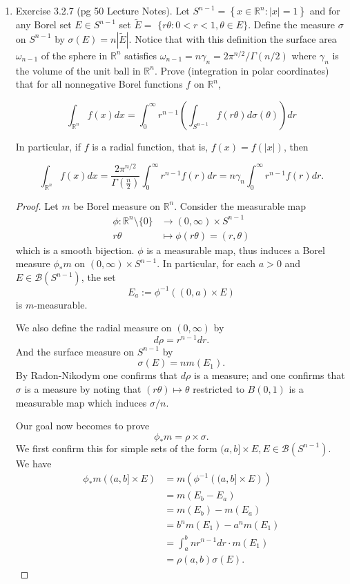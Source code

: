 
\begin{enumerate}
	\item Exercise 3.2.7 (pg 50 Lecture Notes). 
Let $S^{n-1}=\left\{x \in \mathbb{R}^n:|x|=1\right\}$ and for any Borel set $E \in S^{n-1}$ set $\widetilde{E}=$ $\{r \theta: 0<r<1, \theta \in E\}$. Define the measure $\sigma$ on $S^{n-1}$ by $\sigma(E)=n|\widetilde{E}|$. Notice that with this definition the surface area $\omega_{n-1}$ of the sphere in $\mathbb{R}^n$ satisfies $\omega_{n-1}=n \gamma_n=2 \pi^{n / 2} / \Gamma(n / 2)$ where $\gamma_n$ is the volume of the unit ball in $\mathbb{R}^n$. Prove (integration in polar coordinates) that for all nonnegative Borel functions $f$ on $\mathbb{R}^n$,

\[
\int_{\mathbb{R}^n} f(x) d x=\int_0^{\infty} r^{n-1}\left(\int_{S^{n-1}} f(r \theta) d \sigma(\theta)\right) d r
\]


In particular, if $f$ is a radial function, that is, $f(x)=f(|x|)$, then

\[
\int_{\mathbb{R}^n} f(x) d x=\frac{2 \pi^{n / 2}}{\Gamma\left(\frac{n}{2}\right)} \int_0^{\infty} r^{n-1} f(r) d r=n \gamma_n \int_0^{\infty} r^{n-1} f(r) d r
.\]
\begin{proof}
	Let $m$ be Borel measure on $\mathbb{R}^n$.
	Consider the measurable map
	\begin{align*}
		\phi: \mathbb{R}^n \setminus \{0\}  &\longrightarrow (0,\infty ) \times S^{n - 1} \\
		r \theta &\longmapsto \phi(r \theta) = (r, \theta)
	\end{align*}
	which is a smooth bijection. $\phi$ is a measurable map, thus induces a Borel measure $\phi_*m$ on $(0,\infty ) \times S^{n - 1}$. In particular, for each $a > 0$ and $E \in \mathcal{B}(S^{n - 1})$, the set
	\[
		E_a := \phi^{ - 1} \left( (0,a) \times E \right) 
	\] 
	is $m$-measurable.

	We also define the radial measure on $(0,\infty )$ by
	\[
		d \rho = r^{n - 1} dr
	.\] 
	And the surface measure on $S^{n - 1}$ by
	\[
		\sigma(E) = n m(E_1)
	.\] 
	By Radon-Nikodym one confirms that $d \rho$ is a measure; and one confirms that $\sigma$ is a measure by noting that $(r \theta) \mapsto \theta$ restricted to $B(0,1)$ is a measurable map which induces $\sigma / n$.

	Our goal now becomes to prove
	\[
		\phi_* m = \rho \times \sigma
	.\] 
	We first confirm this for simple sets of the form $(a, b] \times E , E \in \mathcal{B}(S^{n - 1})$. We have
	\begin{align*}
		\phi_*m \left( (a,b] \times E \right) 
		&= m\left( \phi^{-1} \left( (a,b] \times E \right)  \right)  \\
		&= m(E_b - E_a) \\
		&= m(E_b) - m(E_a) \\
		&= b^n m(E_1) - a^n m(E_1) \\
		&= \int _a^b n r^{n - 1} d r \cdot m(E_1) \\
		&= \rho(a, b) \sigma(E) 
	.\end{align*}


\end{proof}
\end{enumerate}
